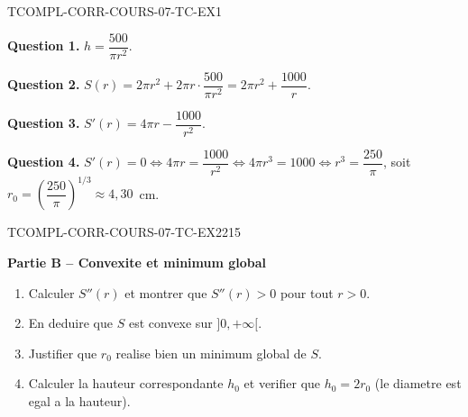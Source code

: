 \begin{corrige}{TCOMPL-CORR-COURS-07-TC-EX1}

\textbf{Question 1.} $h = \dfrac{500}{\pi r^2}$.

\textbf{Question 2.} $S(r) = 2\pi r^2 + 2\pi r \cdot \dfrac{500}{\pi r^2} = 2\pi r^2 + \dfrac{1000}{r}$.


\textbf{Question 3.} $S'(r) = 4\pi r - \dfrac{1000}{r^2}$.

\textbf{Question 4.} $S'(r) = 0 \iff 4\pi r = \dfrac{1000}{r^2} \iff 4\pi r^3 = 1000 \iff r^3 = \dfrac{250}{\pi}$, soit $r_0 = \left(\dfrac{250}{\pi}\right)^{1/3} \approx 4{,}30$~cm.

\end{corrige}

\bigskip


\begin{exercice}{TCOMPL-CORR-COURS-07-TC-EX2}{2}{15}

\textbf{Partie B -- Convexite et minimum global}

\begin{enumerate}
  \item Calculer $S''(r)$ et montrer que $S''(r) > 0$ pour tout $r > 0$.
  \item En deduire que $S$ est convexe sur $]0, +\infty[$.
  \item Justifier que $r_0$ realise bien un minimum global de $S$.
  \item Calculer la hauteur correspondante $h_0$ et verifier que $h_0 = 2r_0$ (le diametre est egal a la hauteur).
\end{enumerate}

\end{exercice}

